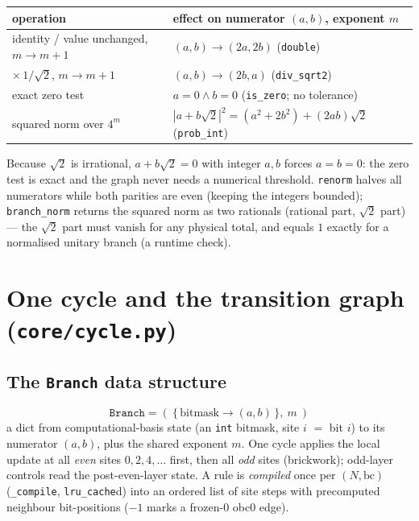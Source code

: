 \documentclass[11pt]{article}
\newcommand{\pf}[1]{\texttt{#1}}          %
\newcommand{\fn}[1]{\texttt{#1}}          %
\begin{document}
\begin{center}\small
\begin{tabular}{@{}ll@{}}
\toprule
operation & effect on numerator $(a,b)$, exponent $m$ \\
\midrule
identity / value unchanged, $m\!\to\!m{+}1$ & $(a,b)\to(2a,2b)$ \quad(\fn{double})\\
$\times\,1/\sqrt2$, $m\!\to\!m{+}1$ & $(a,b)\to(2b,a)$ \quad(\fn{div\_sqrt2})\\
exact zero test & $a=0 \wedge b=0$ \quad(\fn{is\_zero}; no tolerance)\\
squared norm over $4^m$ & $|a+b\sqrt2|^2=(a^2+2b^2)+(2ab)\sqrt2$ \quad(\fn{prob\_int})\\
\bottomrule
\end{tabular}
\end{center}

Because $\sqrt2$ is irrational, $a+b\sqrt2=0$ with integer $a,b$ forces $a=b=0$:
the zero test is exact and the graph never needs a numerical threshold.
\fn{renorm} halves all numerators while both parities are even (keeping the
integers bounded); \fn{branch\_norm} returns the squared norm as two rationals
(rational part, $\sqrt2$ part) --- the $\sqrt2$ part must vanish for any physical
total, and equals $1$ exactly for a normalised unitary branch (a runtime check).

\section{One cycle and the transition graph (\pf{core/cycle.py})}
\label{sec:cycle}

\subsection{The \fn{Branch} data structure}
\label{sec:branch}
\[
\fn{Branch}=(\ \{\,\text{bitmask}\to(a,b)\,\},\ m\ )
\]
a dict from computational-basis state (an \fn{int} bitmask, site $i$ $=$ bit $i$)
to its numerator $(a,b)$, plus the shared exponent $m$. One cycle applies the
local update at all \emph{even} sites $0,2,4,\dots$ first, then all \emph{odd}
sites (brickwork); odd-layer controls read the post-even-layer state. A rule is
\emph{compiled} once per $(N,\text{bc})$ (\fn{\_compile}, \fn{lru\_cache}d) into
an ordered list of site steps with precomputed neighbour bit-positions
($-1$ marks a frozen-$0$ obc0 edge).
\end{document}
